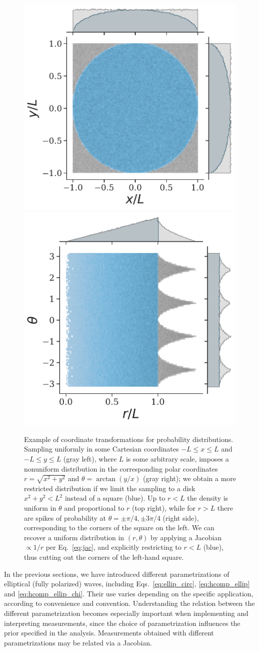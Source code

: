\documentclass[aps,prd,twocolumn,superscriptaddress,preprintnumbers,floatfix,nofootinbib]{revtex4-2}
\newcommand*{\eq}[1]{Eq.~\eqref{eq:#1}}
\begin{document}
\begin{figure}
\includegraphics[width=0.49\columnwidth]{jac_example_0}
\includegraphics[width=0.49\columnwidth]{jac_example_1}
\caption{Example of coordinate transformations for probability distributions.
Sampling uniformly in some Cartesian coordinates $-L \leq x \leq L$ and $-L \leq y \leq L$ (gray left), where $L$ is some arbitrary scale, imposes a nonuniform distribution in the corresponding polar coordinates $r = \sqrt{x^2 + y^2}$ and $\theta = \arctan(y/x)$ (gray right); we obtain a more restricted distribution if we limit the sampling to a disk $x^2 + y^2 < L^2$ instead of a square (blue). 
Up to $r < L$ the density is uniform in $\theta$ and proportional to $r$ (top right), while for $r>L$ there are spikes of probability at $\theta = \pm \pi/4,\pm 3\pi/4$ (right side), corresponding to the corners of the square on the left.
We can recover a uniform distribution in $(r, \theta)$ by applying a Jacobian $\propto 1/r$ per \eq{jac}, and explicitly restricting to $r< L$ (blue), thus cutting out the corners of the left-hand square.}
\label{fig:jac_example}
\end{figure}

In the previous sections, we have introduced different parametrizations of elliptical (fully polarized) waves, including Eqs.~\eqref{eq:ellip_circ}, \eqref{eq:hcomp_ellip} and \eqref{eq:hcomp_ellip_chi}.
Their use varies depending on the specific application, according to convenience and convention.
Understanding the relation between the different parametrization becomes especially important when implementing and interpreting measurements, since the choice of parametrization influences the prior specified in the analysis.
Measurements obtained with different parametrizations may be related via a Jacobian.
\end{document}
